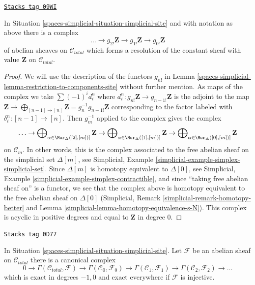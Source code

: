 \begin{lemma}
\label{spaces-simplicial-lemma-simplicial-resolution-Z-site}
\href{https://stacks.math.columbia.edu/tag/09WI}{\texttt{Stacks tag 09WI}}

In Situation \ref{spaces-simplicial-situation-simplicial-site} and with notation as above
there is a complex
$$
\ldots \to g_{2!}\mathbf{Z} \to g_{1!}\mathbf{Z} \to g_{0!}\mathbf{Z}
$$
of abelian sheaves on $\mathcal{C}_{total}$ which forms a resolution of
the constant sheaf with value $\mathbf{Z}$ on $\mathcal{C}_{total}$.
\end{lemma}

\begin{proof}
We will use the description of the functors $g_{n!}$ in
Lemma \ref{spaces-simplicial-lemma-restriction-to-components-site} without further mention.
As maps of the complex we take $\sum (-1)^i d^n_i$ where
$d^n_i : g_{n!}\mathbf{Z} \to g_{n - 1!}\mathbf{Z}$ is the
adjoint to the map $\mathbf{Z} \to
\bigoplus_{[n - 1] \to [n]} \mathbf{Z} = g_n^{-1}g_{n - 1!}\mathbf{Z}$
corresponding to the factor labeled with $\delta^n_i : [n - 1] \to [n]$.
Then $g_m^{-1}$ applied to the complex gives the complex
$$
\ldots \to
\bigoplus\nolimits_{\alpha \in \Mor_\Delta([2], [m])]} \mathbf{Z} \to
\bigoplus\nolimits_{\alpha \in \Mor_\Delta([1], [m])]} \mathbf{Z} \to
\bigoplus\nolimits_{\alpha \in \Mor_\Delta([0], [m])]} \mathbf{Z}
$$
on $\mathcal{C}_m$.
In other words, this is the complex associated to the
free abelian sheaf on the simplicial set $\Delta[m]$, see
Simplicial, Example \ref{simplicial-example-simplex-simplicial-set}.
Since $\Delta[m]$ is homotopy equivalent to $\Delta[0]$, see
Simplicial, Example \ref{simplicial-example-simplex-contractible},
and since ``taking free abelian sheaf on'' is a functor,
we see that the complex above is homotopy equivalent to
the free abelian sheaf on $\Delta[0]$
(Simplicial, Remark \ref{simplicial-remark-homotopy-better} and
Lemma \ref{simplicial-lemma-homotopy-equivalence-s-N}).
This complex is acyclic in positive degrees
and equal to $\mathbf{Z}$ in degree $0$.
\end{proof}

\begin{lemma}
\label{spaces-simplicial-lemma-cech-complex}
\href{https://stacks.math.columbia.edu/tag/0D77}{\texttt{Stacks tag 0D77}}

In Situation \ref{spaces-simplicial-situation-simplicial-site}. Let $\mathcal{F}$ be an abelian
sheaf on $\mathcal{C}_{total}$ there is a canonical complex
$$
0 \to \Gamma(\mathcal{C}_{total}, \mathcal{F}) \to
\Gamma(\mathcal{C}_0, \mathcal{F}_0) \to
\Gamma(\mathcal{C}_1, \mathcal{F}_1) \to
\Gamma(\mathcal{C}_2, \mathcal{F}_2) \to \ldots
$$
which is exact in degrees $-1, 0$ and exact everywhere
if $\mathcal{F}$ is injective.
\end{lemma}


